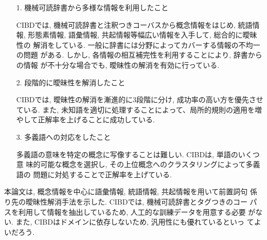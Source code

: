 \vspace*{3mm}
\begin{itemize}
\item[1.] 機械可読辞書から多様な情報を利用したこと

CIBDでは, 機械可読辞書と注釈つきコーバスから概念情報をはじめ, 統語情報, 
形態素情報, 語彙情報, 共起情報等幅広い情報を入手して, 総合的に曖昧性の
解消をしている. 一般に辞書には分野によってカバーする情報の不均一の問題
がある. しかし, 各情報の相互補完性を利用することにより, 辞書からの情報
が不十分な場合でも, 曖昧性の解消を有効に行っている.   
\vspace*{2mm}
\item[2.] 段階的に曖昧性を解消したこと

CIBDでは, 曖昧性の解消を漸進的に3段階に分け, 成功率の高い方を優先させ
ている. また, 未知語を適切に処理することによって、局所的規則の適用を増
やして正解率を上げることに成功している.   
\vspace*{2mm}
\item[3.] 多義語への対応をしたこと

多義語の意味を特定の概念に写像することは難しい. CIBDは, 単語のいくつ意
味的可能な概念を選択し, その上位概念へのクラスタリングによって多義語の
問題に対処することで正解率を上げている.  
\end{itemize}

\vspace*{3mm}

本論文は, 概念情報を中心に語彙情報, 統語情報, 共起情報を用いて前置詞句
係り先の曖昧性解消手法を示した. CIBDでは, 機械可読辞書とタグつきのコー
パスを利用して情報を抽出しているため, 人工的な訓練データを用意する必要
がない. また, CIBDはドメインに依存しないため, 汎用性にも優れているといっ
てよいだろう.

